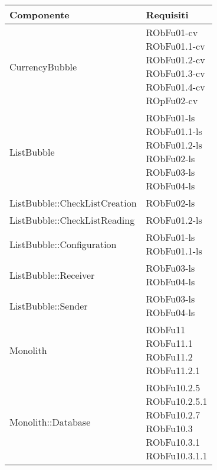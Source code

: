 \begin{center}
\begin{longtable}{|
*{1}{>{\centering\arraybackslash}m{7.5cm}|}
*{1}{>{\centering\arraybackslash}m{2.5cm}|}}
\hline \textbf{Componente} & \textbf{Requisiti}\\
\hline \endhead
\hline \endfoot

CurrencyBubble & \makecell{RObFu01-cv
\\RObFu01.1-cv
\\RObFu01.2-cv
\\RObFu01.3-cv
\\RObFu01.4-cv
\\ROpFu02-cv
\\}\\\hline
ListBubble & \makecell{RObFu01-ls
\\RObFu01.1-ls
\\RObFu01.2-ls
\\RObFu02-ls
\\RObFu03-ls
\\RObFu04-ls
\\}\\\hline
ListBubble::CheckListCreation & \makecell{RObFu02-ls
\\}\\\hline
ListBubble::CheckListReading & \makecell{RObFu01.2-ls
\\}\\\hline
ListBubble::Configuration & \makecell{RObFu01-ls
\\RObFu01.1-ls
\\}\\\hline
ListBubble::Receiver & \makecell{RObFu03-ls
\\RObFu04-ls
\\}\\\hline
ListBubble::Sender & \makecell{RObFu03-ls
\\RObFu04-ls
\\}\\\hline
Monolith & \makecell{RObFu11
\\RObFu11.1
\\RObFu11.2
\\RObFu11.2.1
\\}\\\hline
Monolith::Database & \makecell{RObFu10.2.5
\\RObFu10.2.5.1
\\RObFu10.2.7
\\RObFu10.3
\\RObFu10.3.1
\\RObFu10.3.1.1
}
\end{longtable}
\end{center}
